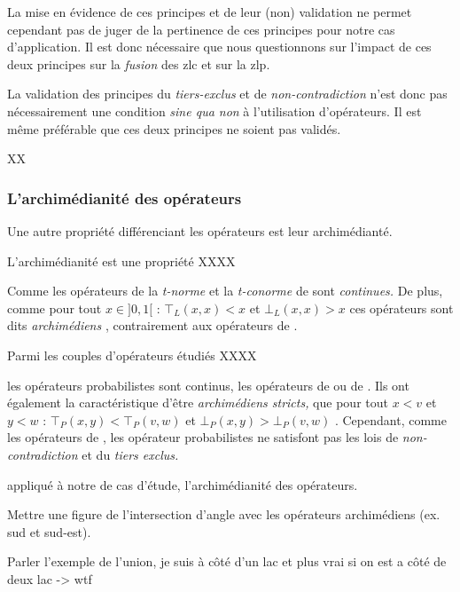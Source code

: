 La mise en évidence de ces principes et de leur (non) validation ne
permet cependant pas de juger de la pertinence de ces principes pour
notre cas d’application. Il est donc nécessaire que nous questionnons
sur l'impact de ces deux principes sur la \emph{fusion} des \ac{zlc}
et sur la \ac{zlp}.




La validation des principes du \emph{tiers-exclus} et de
\emph{non-contradiction} n'est donc pas nécessairement une condition
\emph{sine qua non} à l'utilisation d'opérateurs. Il est même
préférable que ces deux principes ne soient pas validés.

XX


\subsubsection{L'archimédianité des opérateurs}

Une autre propriété différenciant les opérateurs est leur
archimédianté.

L'archimédianité est une propriété XXXX

Comme les opérateurs de \textcite{Zadeh1965} la \emph{t-norme} et la
\emph{t-conorme} de  sont \emph{continues.} De plus,
comme pour tout \(x \in ]0,1[\) : \(⊤_L(x,x) < x\) et
\( ⊥_L(x,x) > x\) ces opérateurs sont dits \emph{archimédiens}
\autocite{Bouchon-Meunier1995}, contrairement aux opérateurs de
\textcite{Zadeh1965}.

Parmi les couples d'opérateurs étudiés XXXX


les opérateurs probabilistes
sont continus, les opérateurs de \textcite{Zadeh1965} ou de
. Ils ont également la caractéristique d'être
\emph{archimédiens stricts,} \ie que pour tout \(x < v\) et \(y < w\)
: \(⊤_P(x,y) < ⊤_P(v,w)\) et \(⊥_P(x,y) > ⊥_P(v,w)\)
\autocite{Bouchon-Meunier1995}. Cependant, comme les opérateurs de
\textcite{Zadeh1965}, les opérateur probabilistes ne satisfont pas les
lois de \emph{non-contradiction} et du \emph{tiers exclus.}




appliqué à notre de cas d'étude, l'archimédianité des opérateurs.

Mettre une figure de l'intersection d'angle avec les opérateurs
archimédiens (ex. sud et sud-est).

Parler l'exemple de l'union, je suis à côté d'un lac et plus vrai si
on est a côté de deux lac -> wtf

